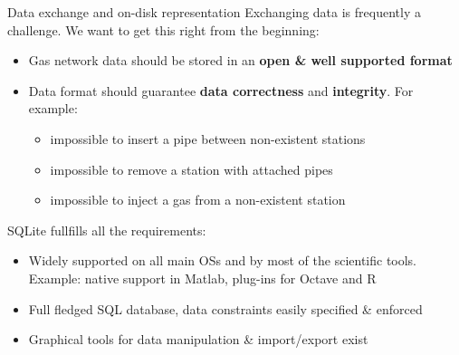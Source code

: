 \documentclass[10pt,aspectratio=169]{beamer}
\begin{document}
\begin{frame}{Data exchange and on-disk representation}
    Exchanging data is frequently a challenge. We want to get this right from the beginning:
    \begin{itemize}
        \item Gas network data should be stored in an \textbf{open \& well supported format}
        \item Data format should guarantee \textbf{data correctness} and \textbf{integrity}. For example:
        \begin{itemize}
            \item impossible to insert a pipe between non-existent stations
            \item impossible to remove a station with attached pipes
            \item impossible to inject a gas from a non-existent station
        \end{itemize}
    \end{itemize}

    \vspace{2mm}

    SQLite fullfills all the requirements:
    \begin{itemize}
        \item Widely supported on all main OSs and by most of the scientific tools. Example: native support in Matlab, plug-ins for Octave and R
        \item Full fledged SQL database, data constraints easily specified \& enforced
        \item Graphical tools for data manipulation \& import/export exist
    \end{itemize}
\end{frame}
\end{document}
